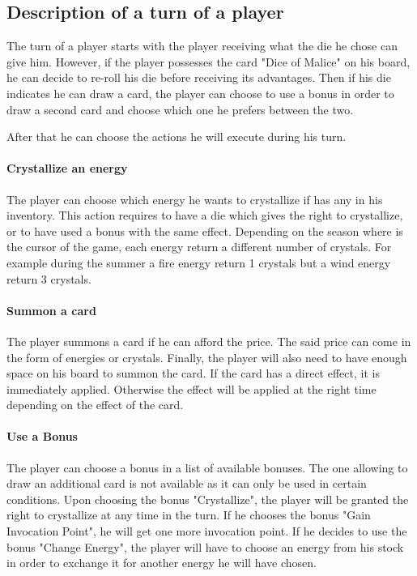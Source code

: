         \subsection{Description of a turn of a player}
            The turn of a player starts with the player receiving what the die he chose can give him. However, if the player possesses the card "Dice of Malice" on his board, he can decide to re-roll his die before receiving its advantages.
            Then if his die indicates he can draw a card, the player can choose to use a bonus in order to draw a second card and choose which one he prefers between the two.
            
            After that he can choose the actions he will execute during his turn.
            
            \paragraph{Crystallize an energy}
            The player can choose which energy he wants to crystallize if has any in his inventory. This action requires to have a die which gives the right to crystallize, or to have used a bonus with the same effect.
            Depending on the season where is the cursor of the game, each energy return a different number of crystals. For example during the summer a fire energy return 1 crystals but a wind energy return 3 crystals.
            
            \paragraph{Summon a card}
            The player summons a card if he can afford the price. The said price can come in the form of energies or crystals. Finally, the  player will also need to have enough space on his board to summon the card.
            If the card has a direct effect, it is immediately applied. Otherwise the effect will be applied at the right time depending on the effect of the card.
            
            \paragraph{Use a Bonus}
            The player can choose a bonus in a list of available bonuses. The one allowing to draw an additional card is not available as it can only be used in certain conditions.
            Upon choosing the bonus "Crystallize", the player will be granted the right to crystallize at any time in the turn.
            If he chooses the bonus "Gain Invocation Point", he will get one more invocation point.
            If he decides to use the bonus "Change Energy", the player will have to choose an energy from his stock in order to exchange it for another energy he will have chosen.
            
